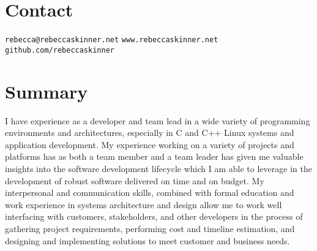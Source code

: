 \documentclass[margin,line]{resume}
\begin{document}
\begin{resume}
\section{\mysidestyle \textbf{Contact}}
{\tt rebecca@rebeccaskinner.net} \hfill {\tt www.rebeccaskinner.net}
\hfill {\tt github.com/rebeccaskinner}\\\vspace{0mm}

\section{\mysidestyle \textbf{Summary}}
I have experience as a developer and team lead in a wide variety of programming
environments and architectures, especially in C and C++ Linux systems and
application development. My experience working on a variety of projects and
platforms has as both a team member and a team leader has given me valuable
insights into the software development lifecycle which I am able to leverage in
the development of robust software delivered on time and on budget. My
interpersonal and communication skills, combined with formal education and work
experience in systems architecture and design allow me to work well interfacing
with customers, stakeholders, and other developers in the process of gathering
project requirements, performing cost and timeline estimation, and designing
and implementing solutions to meet customer and business needs.


\end{resume}
\end{document}
